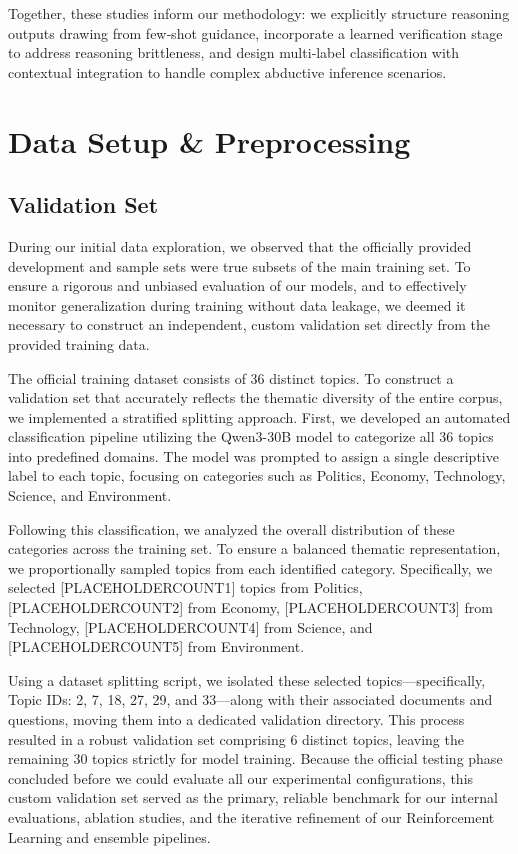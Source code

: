 \documentclass{article}
\begin{document}
Together, these studies inform our methodology: we explicitly structure reasoning outputs drawing from few‑shot guidance, incorporate a learned verification stage to address reasoning brittleness, and design multi‑label classification with contextual integration to handle complex abductive inference scenarios.

\section{Data Setup \& Preprocessing}
\subsection{Validation Set}
During our initial data exploration, we observed that the officially provided development and sample sets were true subsets of the main training set. To ensure a rigorous and unbiased evaluation of our models, and to effectively monitor generalization during training without data leakage, we deemed it necessary to construct an independent, custom validation set directly from the provided training data.

The official training dataset consists of 36 distinct topics. To construct a validation set that accurately reflects the thematic diversity of the entire corpus, we implemented a stratified splitting approach. First, we developed an automated classification pipeline utilizing the Qwen3-30B model to categorize all 36 topics into predefined domains. The model was prompted to assign a single descriptive label to each topic, focusing on categories such as Politics, Economy, Technology, Science, and Environment.

Following this classification, we analyzed the overall distribution of these categories across the training set. To ensure a balanced thematic representation, we proportionally sampled topics from each identified category. Specifically, we selected [PLACEHOLDERCOUNT1] topics from Politics, [PLACEHOLDERCOUNT2] from Economy, [PLACEHOLDERCOUNT3] from Technology, [PLACEHOLDERCOUNT4] from Science, and [PLACEHOLDERCOUNT5] from Environment.

Using a dataset splitting script, we isolated these selected topics—specifically, Topic IDs: 2, 7, 18, 27, 29, and 33—along with their associated documents and questions, moving them into a dedicated validation directory. This process resulted in a robust validation set comprising 6 distinct topics, leaving the remaining 30 topics strictly for model training. Because the official testing phase concluded before we could evaluate all our experimental configurations, this custom validation set served as the primary, reliable benchmark for our internal evaluations, ablation studies, and the iterative refinement of our Reinforcement Learning and ensemble pipelines.
\end{document}
